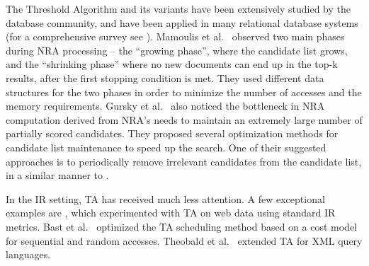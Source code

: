 
The Threshold Algorithm and its variants \cite{Fagin:2001,Fagin:2003,Akbarinia:2007} have been extensively studied by the database community, and have been applied in many relational database systems (for a comprehensive survey see \cite{ilyas2008survey}). 
Mamoulis et al.~\cite{Mamoulis:2007} observed two main phases during NRA processing -- the ``growing phase'', where the candidate list grows, and the ``shrinking phase'' where no new documents can end up in the top-k results, after the first stopping condition is met. They used different data structures for the two phases in order to minimize the number of accesses and the memory requirements. 
Gursky et al.~\cite{Gursky:2008} also noticed the bottleneck in NRA computation derived from NRA's needs to maintain an extremely large number of partially scored candidates. They proposed several optimization methods for candidate list maintenance to speed up the search. One of their suggested approaches is to periodically remove irrelevant candidates from the candidate list, in a similar manner to \alg{}. 

In the IR setting, TA has received much less attention. A few exceptional examples are
\cite{Theobald:2004,Bast:2006,Theobald:2008}, which experimented with TA on web data  using standard IR metrics. Bast et al.~\cite{Bast:2006} optimized the TA scheduling method based on a cost model for sequential and random accesses. Theobald et al.~\cite{Theobald:2008} extended TA for XML query languages. 